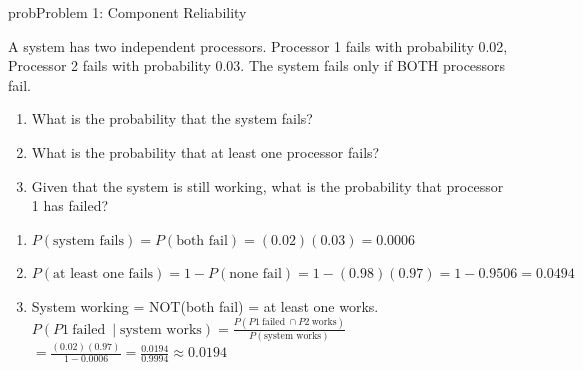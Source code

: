 
\begin{PSbox}[unbreakable]{prob}{Problem 1: Component Reliability}

A system has two independent processors. Processor 1 fails with probability 0.02, Processor 2 fails with probability 0.03. The system fails only if BOTH processors fail.

\begin{enumerate}
\def\labelenumi{(\alph{enumi})}
\tightlist
\item
  What is the probability that the system fails?
\item
  What is the probability that at least one processor fails?
\item
  Given that the system is still working, what is the probability that processor 1 has failed?
\end{enumerate}

\PSsolution{} 

\begin{enumerate}
\def\labelenumi{(\alph{enumi})}
\item
  $P(\text{system fails}) = P(\text{both fail}) = (0.02)(0.03) = 0.0006$
\item
  $P(\text{at least one fails}) = 1 - P(\text{none fail}) = 1 - (0.98)(0.97) = 1 - 0.9506 = 0.0494$
\item
  System working = NOT(both fail) = at least one works.\PSbr{}$\displaystyle P(P1\ \text{failed}\ \mid \text{system works}) = \frac{P(P1\ \text{failed}\ \cap P2\ \text{works})}{P(\text{system works})}$\PSbr{}$\displaystyle = \frac{(0.02)(0.97)}{1 - 0.0006} = \frac{0.0194}{0.9994} \approx 0.0194$
\end{enumerate}

\end{PSbox}

